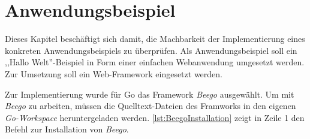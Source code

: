 \chapter{Anwendungsbeispiel}
Dieses Kapitel beschäftigt sich damit, die Machbarkeit der Implementierung eines konkreten Anwendungsbeispiels zu überprüfen.
Als Anwendungsbeispiel soll ein ,,Hallo Welt''-Beispiel in Form einer einfachen Webanwendung umgesetzt werden.
Zur Umsetzung soll ein Web-Framework eingesetzt werden.





Zur Implementierung wurde für Go das Framework \textit{Beego}\cite{Beego} ausgewählt.
Um mit \textit{Beego} zu arbeiten, müssen die Quelltext-Dateien des Framworks in den eigenen \textit{Go-Workspace} heruntergeladen werden.
\autoref{lst:BeegoInstallation} zeigt in Zeile 1 den Befehl zur Installation von \textit{Beego}.

